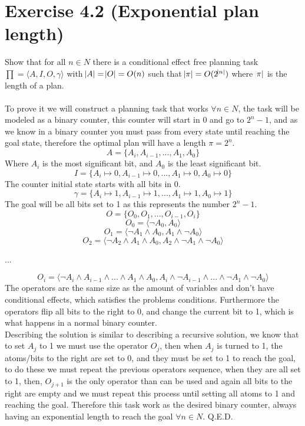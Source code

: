\documentclass[12pt,a4paper]{article}
\begin{document}
\section*{Exercise 4.2 (Exponential plan length)}
Show that for all $n \in N $ there is a conditional effect free planning task $\prod = \langle A, I, O, \gamma \rangle$ with $\abs{A} = \abs{O} = O(n)$ such that $ \abs{\pi} = O(2^{\abs{n}})$ where $\abs{\pi}$ is the length of a plan.\\\\
To prove it we will construct a planning task that works $\forall n \in N$, the task will be modeled as a binary counter, this counter will start in $0$ and go to $2^n - 1$, and as we know in a binary counter you must pass from every state until reaching the goal state, therefore the optimal plan will have a length $\pi = 2^n$.\\
\[A = \lbrace A_i, A_{i-1}, ..., A_1, A_0 \rbrace\]  
Where $A_i$ is the most significant bit, and $A_0$ is the least significant bit.\\
\[I = \lbrace A_i \mapsto 0, A_{i-1} \mapsto 0, ..., A_1 \mapsto 0, A_0 \mapsto 0 \rbrace\]  
The counter initial state starts with all bits in 0.
\[\gamma = \lbrace A_i \mapsto 1, A_{i-1} \mapsto 1, ..., A_1 \mapsto 1, A_0 \mapsto 1 \rbrace\] 
The goal will be all bits set to 1 as this represents the number $2^n - 1$.\\

\[O = \lbrace O_0, O_1, ..., O_{i-1}, O_{i} \rbrace \]
\[O_0 = \langle \neg A_0, A_0\rangle \]
\[O_1 = \langle \neg A_1 \land A_0, A_1 \land \neg A_0 \rangle \]
\[O_2 = \langle \neg A_2 \land A_1 \land A_0, A_2 \land \neg A_1 \land \neg A_0 \rangle \]
\begin{center}
	...
\end{center}
\[O_i = \langle \neg A_i \land A_{i-1} \land ... \land A_1 \land A_0, A_i\land \neg A_{i-1} \land ... \land \neg A_1 \land \neg A_0 \rangle \]
The operators are the same size as the amount of variables and don't have conditional effects, which satisfies the problems conditions.
Furthermore the operators flip all bits to the right to 0, and change the current bit to 1, which is what happens in a normal binary counter.\\
Describing the solution is similar to describing a recursive solution, we know that to set $A_j$ to 1 we must use the operator $O_j$, then when $A_j$ is turned to 1, the atoms/bits to the right are set to 0, and they must be set to 1 to reach the goal, to do these we must repeat the previous operators sequence, when they are all set to 1, then, $O_{j+1}$ is the only operator than can be used and again all bits to the right are empty and we must repeat this process until setting all atoms to 1 and reaching the goal. Therefore this task work as the desired binary counter, always having an exponential length to reach the goal $\forall n \in N$. Q.E.D.
\end{document}
